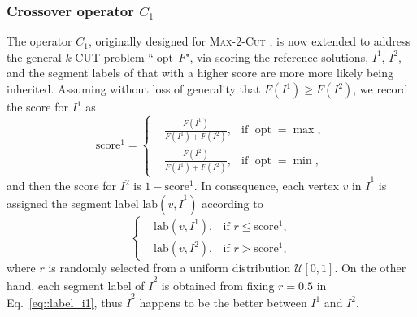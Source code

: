 \documentclass[12pt, a4paper]{article}%
\DeclareMathOperator*{\opt}{\ensuremath{opt}}
\newcommand{\score}{\ensuremath{\mathrm{score}}}
\newcommand{\labeling}{\ensuremath{\mathrm{lab}}}
\numberwithin{equation}{section}
\theoremstyle{plain}
\begin{document}


\subsubsection{Crossover operator $C_1$}
\label{sec::c1}

The operator $C_1$, originally designed for \textsc{Max}-$2$-\textsc{Cut} \cite{Marti2009}, is now extended to address the general $k$-CUT problem ``$\opt\,F$", via scoring the reference solutions, $I^1$, $I^2$, and the segment labels of that with a higher score are more more likely being inherited. Assuming without loss of generality that $F(I^1)\geq F(I^2)$, 
we record the score for $I^1$ as
$$
\score^1=\left\{
\begin{aligned}
&\frac{F(I^1)}{F(I^1)+F(I^2)},&\text{if } \opt=\max,\\
&\frac{F(I^2)}{F(I^1)+F(I^2)},&\text{if } \opt=\min,
\end{aligned}
\right.
$$
and then the score for $I^2$ is $1-\score^1$. 
In consequence, each vertex $v$ in $\bar{I}^1$ is assigned the segment label $\labeling(v,\bar{I}^1)$ according to
\begin{equation}
\label{eq::label_i1}
\left\{
\begin{aligned}
	&\labeling(v,I^1),&\text{if } r\leq \score^1,\\
	&\labeling(v,I^2),&\text{if } r> \score^1,
\end{aligned}
\right.
\end{equation}
where $r$ is randomly selected from a uniform distribution $\mathcal{U}[0,1]$. On the other hand, each segment label of $\bar{I}^2$ is obtained from fixing $r=0.5$ in Eq.~\eqref{eq::label_i1}, thus $\bar{I}^2$ happens to be the better between $I^1$ and $I^2$. 
\end{document}
